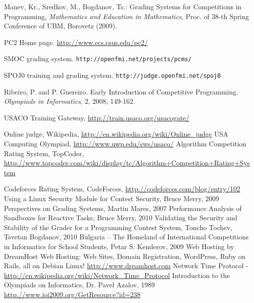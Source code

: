 \documentclass[a4paper,12pt]{article}
\begin{document}
  \begin{thebibliography}{99}

      Manev, Kr.,  Sredkov, M., Bogdanov, Ts.: Grading Systems for Competitions in Programming, \textit{Mathematics and Education in Mathematics}, Proc. of 38-th Spring Conference of UBM, Borovetz (2009). 
    
      PC2 Home page. \url{http://www.ecs.csus.edu/pc2/}

      SMOC grading system. \texttt{http://openfmi.net/projects/pcms/}

      SPOJ0 training and grading system. \texttt{http://judge.openfmi.net/spoj0}

      Ribeiro, P. and P. Guereiro. Early Introduction of Competitive Programming. \textit{Olympiads in Informatics}, 2, 2008, 149-162.

     USACO Training Gateway, \url{http://train.usaco.org/usacogate/}
    
      Online judge, Wikipedia, \url{http://en.wikipedia.org/wiki/Online_judge}
      USA Computing Olympiad, \url{http://www.uwp.edu/sws/usaco/}
      Algorithm Competition Rating System, TopCoder, \url{http://www.topcoder.com/wiki/display/tc/Algorithm+Competition+Rating+System}
      
      Codeforces Rating System, CodeForces, \url{http://codeforces.com/blog/entry/102}
      Using a Linux Security Module for Contest Security, Bruce Merry, 2009
      Perspectives on Grading Systems, Martin Mares, 2007
      Performance Analysis of Sandboxes for Reactive Tasks, Bruce Merry, 2010
      Validating the Security and Stability of the Grader for a Programming Contest System, Toncho Tochev, Tsvetan Bogdanov, 2010
      Bulgaria – The Homeland of International Competitions in Informatics for School Students, Petar S. Kenderov, 2009
      Web Hosting by DreamHost Web Hosting: Web Sites, Domain Registration, WordPress, Ruby on Rails, all on Debian Linux! \url{http://www.dreamhost.com}
      Network Time Protocol - \url{http://en.wikipedia.org/wiki/Network_Time_Protocol}
      Introduction to the Olympiads on Informatics, Dr. Pavel Azalov, 1989 \url{http://www.ioi2009.org/GetResource?id=238}
      

\end{thebibliography}
\end{document}
